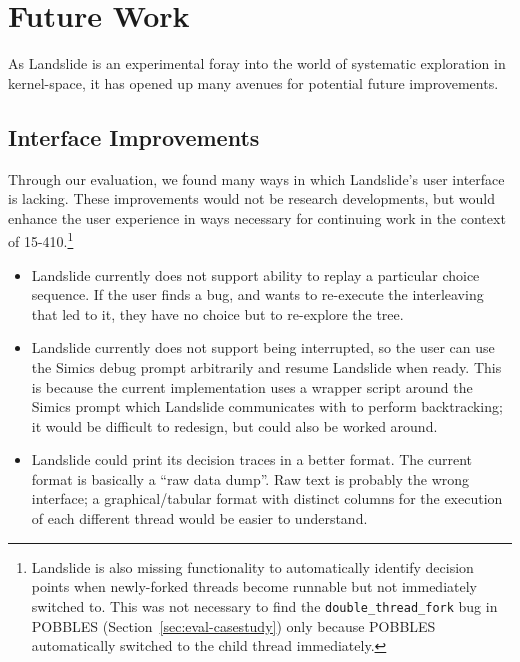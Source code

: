 \section{Future Work}
\label{sec:future}

As Landslide is an experimental foray into the world of systematic exploration in kernel-space, it has opened up many avenues for potential future improvements.

\subsection{Interface Improvements}
\label{sec:future-interface}

Through our evaluation, we found many ways in which Landslide's user interface is lacking. These improvements would not be research developments, but would enhance the user experience in ways necessary for continuing work in the context of 15-410.\footnote{
Landslide is also missing functionality to automatically identify decision points when newly-forked threads become runnable but not immediately switched to. This was not necessary to find the \texttt{double\_thread\_fork} bug in POBBLES (Section~\ref{sec:eval-casestudy}) only because POBBLES automatically switched to the child thread immediately.}

\begin{itemize}
	\item Landslide currently does not support ability to replay a particular choice sequence. If the user finds a bug, and wants to re-execute the interleaving that led to it, they have no choice but to re-explore the tree.
	\item Landslide currently does not support being interrupted, so the user can use the Simics debug prompt arbitrarily and resume Landslide when ready. This is because the current implementation uses a wrapper script around the Simics prompt which Landslide communicates with to perform backtracking; it would be difficult to redesign, but could also be worked around.
	\item Landslide could print its decision traces in a better format. The current format is basically a ``raw data dump''. Raw text is probably the wrong interface; a graphical/tabular format with distinct columns for the execution of each different thread would be easier to understand.
\end{itemize}

